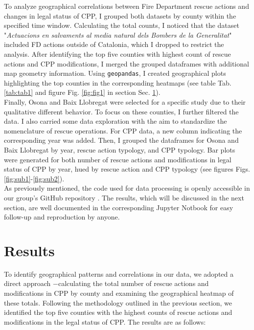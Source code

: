 \documentclass[
  journal=small,
  manuscript=mini-article,  %
  year=2023,
  volume=1,
]{odj-journal}
\begin{document}
To analyze geographical correlations between Fire Department rescue actions and changes in legal status of CPP, I grouped both datasets by county within the specified time window. Calculating the total counts, I noticed that the dataset "\textit{Actuacions en salvaments al media natural dels Bombers de la Generalitat}" included FD actions outside of Catalonia, which I dropped to restrict the analysis. After identifying the top five counties with highest count of rescue actions and CPP modifications, I merged the grouped dataframes with additional map geometry information. Using \texttt{geopandas}, I created geographical plots highlighting the top counties in the corresponding heatmaps (see table Tab. \ref{tab:tab1} and figure Fig. \ref{fig:fig1} in section Sec. \ref{sec:res}).\\

Finally, Osona and Baix Llobregat were selected for a specific study due to their qualitative different behavior. To focus on these counties, I further filtered the data. I also carried some data exploration with the aim to standardize the nomenclature of rescue operations. For CPP data, a new column indicating the corresponding year was added. Then, I grouped the dataframes for Osona and Baix Llobregat by year, rescue action typology, and CPP typology. Bar plots were generated for both number of rescue actions and modifications in legal status of CPP by year, hued by rescue action and CPP typology (see figures Figs. \ref{fig:sub1}-\ref{fig:sub2}).\\

As previously mentioned, the code used for data processing is openly accessible in our group's GitHub repository \cite{github_repo}. The results, which will be discussed in the next section, are well documented in the corresponding Jupyter Notbook for easy follow-up and reproduction by anyone.

\section{Results}\label{sec:res}
To identify geographical patterns and correlations in our data, we adopted a direct approach $-$calculating the total number of rescue actions and modifications in CPP by county and examining the geographical heatmap of these totals. Following the methodology outlined in the previous section, we identified the top five counties with the highest counts of rescue actions and modifications in the legal status of CPP. The results are as follows:
\end{document}
